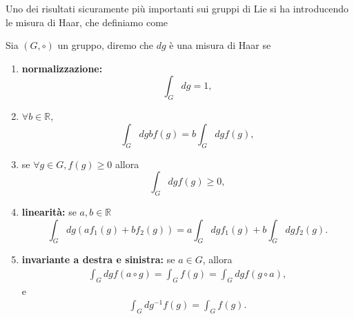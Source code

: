 Uno dei risultati sicuramente più importanti sui gruppi di Lie si ha introducendo le misura di Haar, che definiamo come
\begin{definition}
    Sia $(G, \circ)$ un gruppo, diremo che $dg$ è una misura di Haar se
    \begin{enumerate}[label=\protect\circled{\arabic*}]
        \item \textbf{normalizzazione:} 
        \begin{equation}
            \int_G dg = 1,
        \end{equation}
        \item $\forall b \in \mathbb{R}$,
        \begin{equation}
            \int_G dg bf(g) = b \int_G dg f(g),
        \end{equation}
        \item se $\forall g \in G, f(g) \geq 0$ allora
        \begin{equation}
            \int_G dg f(g) \geq 0,
        \end{equation}
        \item \textbf{linearità:} se $a, b \in \mathbb{R}$
        \begin{equation}
            \int_G dg (af_1(g) + b f_2(g)) = a \int_G dg f_1(g) + b \int_G dg f_2(g).
        \end{equation}
        \item \textbf{invariante a destra e sinistra:} se $a \in G$, allora
        \begin{align}
            \int_G dg f(a \circ g)  = \int_G f(g) = \int_G dg f(g \circ a),
        \end{align}
        e
        \begin{align}
            \int_G dg^{-1} f(g) = \int_G f(g).
        \end{align}
    \end{enumerate}
\end{definition}

